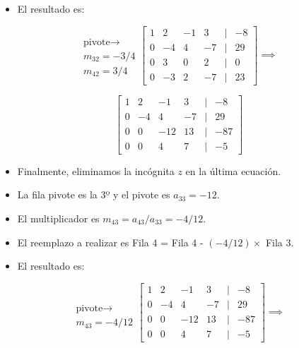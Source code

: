 \documentclass[]{book}
\providecommand{\tightlist}{%
  \setlength{\itemsep}{0pt}\setlength{\parskip}{0pt}}
\begin{document}
\begin{itemize}
\tightlist
\item
  El resultado es:
\end{itemize}

\[
\begin{matrix}
 \\ \text{pivote} \rightarrow \\ m_{32} = -3/4 \\ m_{42} = 3/4
\end{matrix}
\begin{bmatrix}
1 & 2 & -1 & 3 &|& -8\\
0 & -4 & 4 & -7 &|& 29\\
0 & 3 & 0 & 2 &|& 0\\
0 & -3 & 2 & -7 &|& 23  
\end{bmatrix}
\implies
\]

\[
\begin{bmatrix}
1 & 2 & -1 & 3 &|& -8\\
0 & -4 & 4 & -7 &|& 29\\
0 & 0 & -12 & 13 &|& -87\\
0 & 0 & 4 & 7 &|& -5  
\end{bmatrix}
\]

\begin{itemize}
\tightlist
\item
  Finalmente, eliminamos la incógnita \(z\) en la última ecuación.
\item
  La fila pivote es la 3º y el pivote es \(a_{33}=-12\).
\item
  El multiplicador es \(m_{43}=a_{43}/a_{33}=-4/12\).
\item
  El reemplazo a realizar es Fila 4 = Fila 4 - \((-4/12)\times\) Fila 3.
\item
  El resultado es:
\end{itemize}

\[
\begin{matrix}
\\ \\ \text{pivote} \rightarrow \\ m_{43} = -4/12
\end{matrix}
\begin{bmatrix}
1 & 2 & -1 & 3 &|& -8\\
0 & -4 & 4 & -7 &|& 29\\
0 & 0 & -12 & 13 &|& -87\\
0 & 0 & 4 & 7 &|& -5  
\end{bmatrix}
\implies
\]
\end{document}
